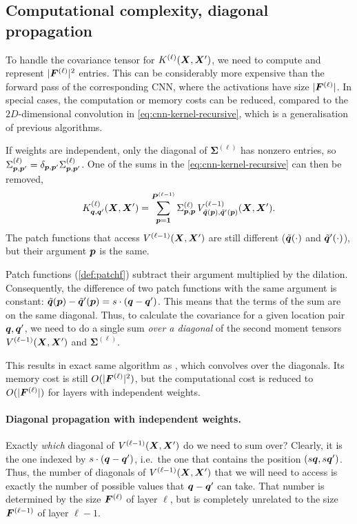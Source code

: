 \documentclass[accepted]{uai2021} %
\newcommand{\layersizebase}{\vF}
\newcommand{\layersize}[1]{{\layersizebase^{\bra{#1}}}}
\newcommand{\patchsizebase}{\vP}
\newcommand{\patchsize}[1]{{\patchsizebase^{\bra{#1}}}}
\newcommand{\patchf}[2]{{\tilde#1\bra{#2}}}
\newcommand{\priorWcovs}[1]{\Sigma^{(#1)}}
\newcommand{\priorWcov}[1]{\boldsymbol{\Sigma}^{(#1)}}
\newcommand{\patch}{\vp}               %
\newcommand{\nextpatch}{\vq}
\newcommand{\covf}[1]{K\ssup{#1}}
\newcommand{\nlinf}[1]{V\ssup{#1}}
\newcommand{\0}{\boldsymbol{0}}
\newcommand{\1}{\boldsymbol{1}}
\newcommand{\crefp}[1]{(\cref{#1})}
\begin{document}
\subsection{Computational complexity, diagonal propagation}
To handle the covariance tensor for $\covf{\ell}\bra{\mX,\mX'}$, we need to compute and represent $\absshort{\layersize{\ell}}^{2}$ entries. This can be considerably more expensive than the forward pass of the corresponding CNN, where the activations have size $\absshort{\layersize{\ell}}$.
In special cases, the computation or memory costs can be reduced, compared to the $2D$-dimensional convolution in \cref{eq:cnn-kernel-recursive}, which is a generalisation of previous algorithms.

If weights are independent, only the diagonal of $\priorWcov{\ell}$ has nonzero entries, so $\priorWcovs{\ell}_{\patch,\patch'} = \delta_{\patch,\patch'}\priorWcovs{\ell}_{\patch,\patch'}$. One of the sums in the \cref{eq:cnn-kernel-recursive} can then be removed,
\begin{equation}
\covf{\ell}_{\nextpatch,\nextpatch'}\bra{\mX, \mX'} =
\sum_{\patch=\1}^{\patchsize{\ell-1}}
\priorWcovs{\ell}_{\patch,\patch} \,
\nlinf{\ell-1}_{\patchf{\nextpatch}{\patch},\patchf{\nextpatch'}{\patch}}\bra{\mX, \mX'}.
\label{eq:cnn-kernel-independent-weights}
\end{equation}
The patch functions that access $\nlinf{\ell-1}\bra{\mX,\mX'}$ are still
different ($\patchf{\nextpatch}{\cdot}$ and $\patchf{\nextpatch'}{\cdot}$), but
their argument $\patch$ is the same.

Patch functions \crefp{def:patchf} subtract their argument multiplied by the dilation. Consequently, the difference  of two patch functions with the same argument is constant: $\patchf{\nextpatch}{\patch} - \patchf{\nextpatch'}{\patch} = s\cdot\bra{\nextpatch - \nextpatch'}$. This means that the terms of the sum are on the same diagonal. Thus, to calculate the covariance for a given location pair $\nextpatch,\nextpatch'$, we need to do a single sum \emph{over a diagonal} of the second moment tensors $\nlinf{\ell-1}\bra{\mX, \mX'}$ and $\priorWcov{\ell}.$

This results in exact same algorithm as \citet{arora2019exact}, which convolves over the diagonals. Its memory cost is still $O(\absshort{\layersize{\ell}}^{2})$, but the computational cost is reduced to $O(\absshort{\layersize{\ell}})$ for layers with independent weights.

\paragraph{Diagonal propagation with independent weights.}
Exactly \emph{which} diagonal of $\nlinf{\ell-1}\bra{\mX, \mX'}$ do we need to sum over? Clearly, it is the one indexed by $s\cdot\bra{\nextpatch - \nextpatch'}$, i.e.~the one that contains the position $\bra{s\nextpatch, s\nextpatch'}$. Thus, the number of diagonals of $\nlinf{\ell-1}\bra{\mX, \mX'}$ that we will need to access is exactly the number of possible values that $\nextpatch-\nextpatch'$ can take. That number is determined by the size $\layersize{\ell}$ of layer $\ell$, but is completely unrelated to the size $\layersize{\ell-1}$ of layer $\ell-1$.
\end{document}
